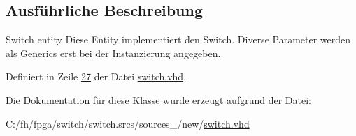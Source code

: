 \subsection{Ausführliche Beschreibung}
Switch entity Diese Entity implementiert den Switch. Diverse Parameter werden als Generics erst bei der Instanzierung angegeben. 

Definiert in Zeile \mbox{\hyperlink{switch_8vhd_source_l00027}{27}} der Datei \mbox{\hyperlink{switch_8vhd_source}{switch.\+vhd}}.



Die Dokumentation für diese Klasse wurde erzeugt aufgrund der Datei\+:\begin{DoxyCompactItemize}
\item 
C\+:/fh/fpga/switch/switch.\+srcs/sources\+\_/new/\mbox{\hyperlink{switch_8vhd}{switch.\+vhd}}\end{DoxyCompactItemize}
